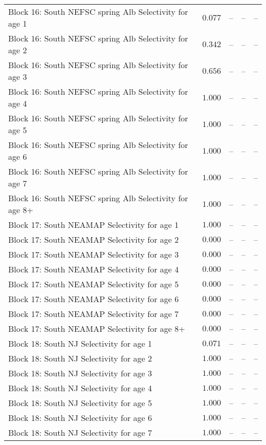 \documentclass[
]{article}
\begin{document}
\begin{landscape}
\begin{longtable}[t]{lrrrr}
Block 16: South NEFSC spring Alb Selectivity for age 1 & $0.077$ & -- & -- & --\\
Block 16: South NEFSC spring Alb Selectivity for age 2 & $0.342$ & -- & -- & --\\
Block 16: South NEFSC spring Alb Selectivity for age 3 & $0.656$ & -- & -- & --\\
\addlinespace
Block 16: South NEFSC spring Alb Selectivity for age 4 & $1.000$ & -- & -- & --\\
Block 16: South NEFSC spring Alb Selectivity for age 5 & $1.000$ & -- & -- & --\\
Block 16: South NEFSC spring Alb Selectivity for age 6 & $1.000$ & -- & -- & --\\
Block 16: South NEFSC spring Alb Selectivity for age 7 & $1.000$ & -- & -- & --\\
Block 16: South NEFSC spring Alb Selectivity for age 8+ & $1.000$ & -- & -- & --\\
\addlinespace
Block 17: South NEAMAP Selectivity for age 1 & $1.000$ & -- & -- & --\\
Block 17: South NEAMAP Selectivity for age 2 & $0.000$ & -- & -- & --\\
Block 17: South NEAMAP Selectivity for age 3 & $0.000$ & -- & -- & --\\
Block 17: South NEAMAP Selectivity for age 4 & $0.000$ & -- & -- & --\\
Block 17: South NEAMAP Selectivity for age 5 & $0.000$ & -- & -- & --\\
\addlinespace
Block 17: South NEAMAP Selectivity for age 6 & $0.000$ & -- & -- & --\\
Block 17: South NEAMAP Selectivity for age 7 & $0.000$ & -- & -- & --\\
Block 17: South NEAMAP Selectivity for age 8+ & $0.000$ & -- & -- & --\\
Block 18: South NJ Selectivity for age 1 & $0.071$ & -- & -- & --\\
Block 18: South NJ Selectivity for age 2 & $1.000$ & -- & -- & --\\
\addlinespace
Block 18: South NJ Selectivity for age 3 & $1.000$ & -- & -- & --\\
Block 18: South NJ Selectivity for age 4 & $1.000$ & -- & -- & --\\
Block 18: South NJ Selectivity for age 5 & $1.000$ & -- & -- & --\\
Block 18: South NJ Selectivity for age 6 & $1.000$ & -- & -- & --\\
Block 18: South NJ Selectivity for age 7 & $1.000$ & -- & -- & --\\

\end{longtable}
\end{landscape}
\end{document}
